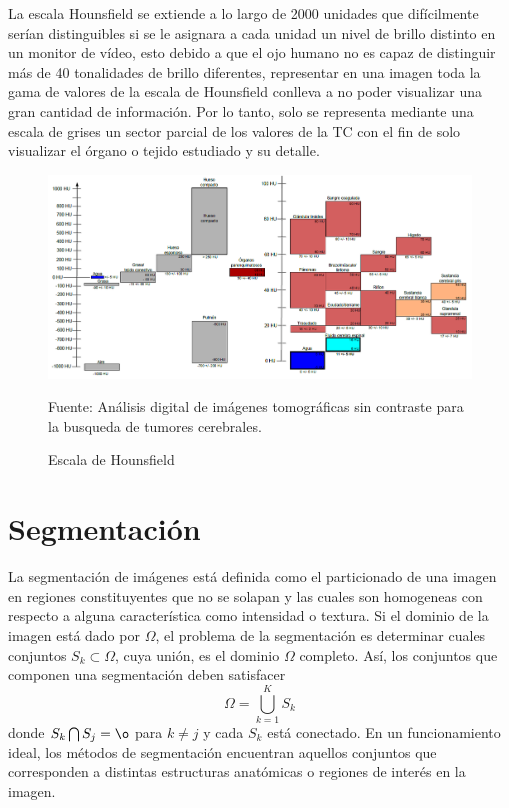 \documentclass[12pt]{report}
\begin{document}
La escala Hounsfield se extiende a lo largo de 2000 unidades que difícilmente serían distinguibles si se le asignara a cada unidad un nivel de brillo distinto en un monitor de vídeo, esto debido a que el ojo humano no es capaz de distinguir más de 40 tonalidades de brillo diferentes, representar en una imagen toda la gama de valores de la escala de Hounsfield conlleva a no poder visualizar una gran cantidad de información. Por lo tanto, solo se representa mediante una escala de grises un sector parcial de los valores de la TC con el fin de solo visualizar el órgano o tejido estudiado y su detalle.\cite{hounsdos}\\
\begin{figure}[H]
\centering
\includegraphics[width = 13 cm, height = 10 cm]{escala}
\caption{Escala de Hounsfield}
Fuente: Análisis digital de imágenes tomográficas sin contraste para la busqueda de tumores cerebrales.
\end{figure}



\section{Segmentación}
La segmentación de imágenes está definida como el particionado de una imagen en regiones constituyentes que no se solapan y las cuales son homogeneas con respecto a alguna característica como intensidad o textura. Si el dominio de la imagen está dado por $\Omega$, el problema de la segmentación es determinar cuales conjuntos $S_{k} \subset \Omega$, cuya unión, es el dominio $\Omega$ completo. Así, los conjuntos que componen una segmentación deben satisfacer \begin{equation} \Omega = \bigcup_{k = 1}^{K} S_{k} \end{equation}
donde $S_{k} \bigcap S_{j} = \o$ para $ k \neq j$ y cada $S_{k}$ está conectado. En un funcionamiento ideal, los métodos de segmentación encuentran aquellos conjuntos que corresponden a distintas estructuras anatómicas o regiones de interés en la imagen.\\
\end{document}
